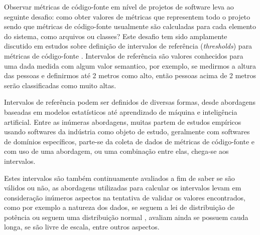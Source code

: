 
Observar métricas de código-fonte em nível de projetos de software leva
ao seguinte desafio: como obter valores de métricas que representem todo o projeto sendo
que métricas de código-fonte usualmente são calculadas para cada elemento do sistema, como arquivos ou classes?
Este desafio tem sido amplamente discutido em estudos sobre definição de
intervalos de referência ({\it thresholds}) para métricas de
código-fonte \cite{Shatnawi2010, Kaur2013, Herbold2011}. Intervalos de
referência são valores conhecidos para uma dada medida
\cite[Chapter~2.1]{Lanza2007} com algum valor semantico, por exemplo, se
medirmos a altura das pessoas e definirmos até 2 metros como alto, então
pessoas acima de 2 metros serão classificadas como muito altas.


Intervalos de referência podem ser definidos de diversas formas, desde
abordagens baseadas em modelos estatísticos \cite{Shatnawi2010, Kaur2013}
até aprendizado de máquina \cite{Herbold2011} e inteligência artificial.
Entre as inúmeras abordagens, muitas partem de estudos empíricos
usando softwares da indústria como objeto de estudo, geralmente com
softwares de domínios específicos, parte-se da coleta de dados de
métricas de código-fonte e com uso de uma abordagem, ou uma combinação entre
elas, chega-se aos intervalos.

Estes intervalos são também continuamente avaliados a fim de saber se são
válidos ou não, as abordagens utilizadas para calcular os intervalos levam em
consideração inúmeros aspectos na tentativa de validar os valores encontrados,
como por exemplo a natureza dos dados, se seguem a lei de distribuição de
potência
\cite{Wheeldon2003,Potanin2005,Concas2007,Ferreira2009,Yao2009,Clauset2009} ou
seguem uma distribuição normal
\cite{Baxter2006,Lanza2007,Herraiz2011,Herraiz2012}, avaliam ainda se possuem
cauda longa, se são livre de escala, entre outros aspectos.

